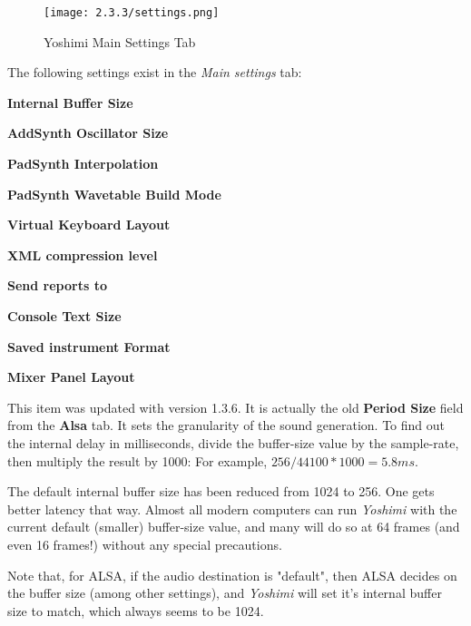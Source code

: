 \begin{figure}[H]
   \centering
   \texttt{[image: 2.3.3/settings.png]}
   \caption{Yoshimi Main Settings Tab}
   \label{fig:yoshimi_main_settings_tab}
\end{figure}

   The following settings exist in the \textsl{Main settings} tab:

   \begin{enumber}
      \item \textbf{Internal Buffer Size}
      \item \textbf{AddSynth Oscillator Size}
      \item \textbf{PadSynth Interpolation}
      \item \textbf{PadSynth Wavetable Build Mode}
      \item \textbf{Virtual Keyboard Layout}
      \item \textbf{XML compression level}
      \item \textbf{Send reports to}
      \item \textbf{Console Text Size}
      \item \textbf{Saved instrument Format}
      \item \textbf{Mixer Panel Layout}
   \end{enumber}

   \setcounter{ItemCounter}{0}      %

   This item was updated with version 1.3.6.  It is actually the old
   \textbf{Period Size} field from the \textbf{Alsa} tab.
   It sets the granularity of the sound generation.
   To find out the internal delay in milliseconds, divide the
   buffer-size value by the sample-rate, then multiply the result by 1000:
   For example, \(256 / 44100 * 1000 = 5.8 ms\).

   The default internal buffer size has been reduced from 1024 to 256.  One
   gets better latency that way.  Almost all modern computers can run
   \textsl{Yoshimi} with the current default (smaller) buffer-size value, and
   many will do so at 64 frames (and even 16 frames!)
   without any special precautions.

   Note that, for ALSA, if the audio destination is "default",
   then ALSA decides on the buffer size (among other settings), and
   \textsl{Yoshimi} will set it's internal buffer size to match,
   which always seems to be 1024.

